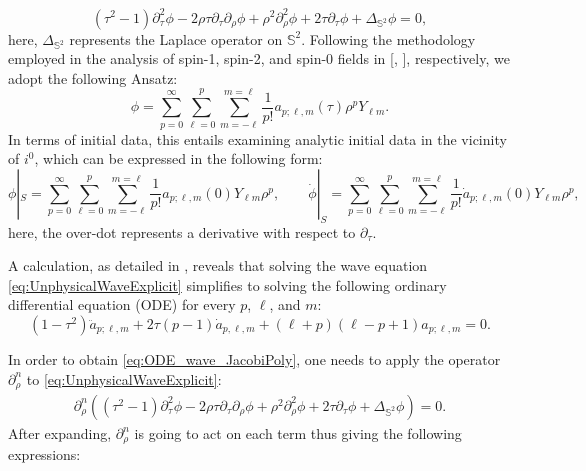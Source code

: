 \begin{equation}\label{eq:UnphysicalWaveExplicit}
  \left(\tau^2-1\right) \partial_\tau^2 \phi-2 \rho \tau \partial_\tau \partial_\rho \phi+\rho^2 \partial_\rho^2 \phi+2 \tau \partial_\tau \phi+\Delta_{\mathbb{S}^2} \phi=0,
\end{equation}
here, $\Delta _{\mathbb{S}^{2}{}}{}$ represents the Laplace operator on $\mathbb{S}^2$. Following the methodology employed in the analysis of spin-1, spin-2, and spin-0 fields in [\cite{ValAli22}, \cite{MinMacKro22}], respectively, we adopt the following Ansatz:
\begin{equation}\label{eq:ansatz}
	\phi = \sum_{p = 0}^{\infty}\sum_{\ell = 0}^{p}\sum_{m = -\ell}^{m = \ell}\frac{1}{p!}a_{p;\ell,m}(\tau)\rho^{p}Y_{\ell m}.
\end{equation}
In terms of initial data, this entails examining analytic initial data in the vicinity of $i^0$, which can be expressed in the following form:
\begin{equation}\label{eq:ID_field}
  \phi|_{{S}} =
  \sum_{p=0}^{\infty}
  \sum_{\ell=0}^{p}\sum_{m=-\ell}^{m=\ell}\frac{1}{p!}a_{p;\ell,m}(0)Y_{\ell
    m}\rho^p, \qquad \dot{\phi}|_{{S}} =
  \sum_{p=0}^{\infty}\sum_{\ell=0}^{p}\sum_{m=-\ell}^{m=\ell}
  \frac{1}{p!}\dot{a}_{p;\ell,m}(0)Y_{\ell
    m}\rho^p,
\end{equation}
here, the over-dot represents a derivative with respect to $\partial_\tau$. 
\begin{proposition}
A calculation, as detailed in \cite{MinMacKro22}, reveals that solving the wave equation \eqref{eq:UnphysicalWaveExplicit} simplifies to solving the following ordinary differential equation (ODE) for every $p$, $\ell$, and $m$:
\begin{equation}\label{eq:ODE_wave_JacobiPoly}
  (1-\tau^2)\ddot{a}_{p;\ell,m} + 2\tau(p-1)\dot{a}_{p,\ell,m}+(\ell+p)(\ell-p+1){a}_{p;\ell,m}=0.
\end{equation}
\end{proposition}
In order to obtain \eqref{eq:ODE_wave_JacobiPoly}, one needs to apply the operator $\partial_{\rho}^{n}$ to \eqref{eq:UnphysicalWaveExplicit}:
\begin{align}\label{eq:ODE_wave_JacobiPolytransformed}
  \partial_{\rho}^{n}\left(\left(\tau^2-1\right) \partial_\tau^2 \phi-2 \rho \tau \partial_\tau \partial_\rho \phi+\rho^2 \partial_\rho^2 \phi+2 \tau \partial_\tau \phi+\Delta_{\mathbb{S}^2} \phi\right)=0.
\end{align}
After expanding, $\partial_{\rho}^{n}$ is going to act on each term thus giving the following expressions:
